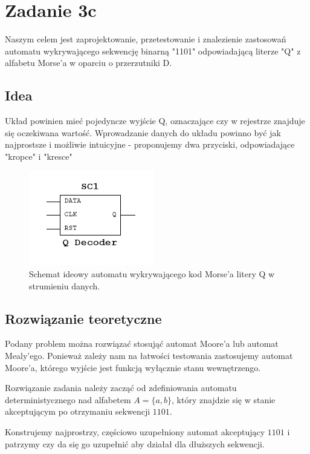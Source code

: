 \documentclass[12pt,a4paper,table]{article}
\begin{document}
    \pagebreak
    \section{Zadanie 3c}
    Naszym celem jest zaprojektowanie, przetestowanie i znalezienie zastosowań automatu wykrywającego sekwencję binarną "1101" odpowiadającą
    literze "Q" z alfabetu Morse'a w oparciu o przerzutniki D.

    \subsection{Idea}
    Układ powinien mieć pojedyncze wyjście Q, oznaczające czy w rejestrze znajduje się oczekiwana wartość.
    Wprowadzanie danych do układu powinno być jak najprostsze i możliwie intuicyjne - proponujemy dwa 
    przyciski, odpowiadające "kropce" i "kresce"


    \begin{figure}[h]
        \centering
        \includegraphics[width=0.3\linewidth]{images/q_idea.PNG}
        \caption{Schemat ideowy automatu wykrywającego kod Morse'a litery Q
        w strumieniu danych.}
        \label{fig:q_idea}
    \end{figure}

    \subsection{Rozwiązanie teoretyczne}
    Podany problem można rozwiązać stosująć automat Moore'a lub automat Mealy'ego.
    Ponieważ zależy nam na łatwości testowania zastosujemy automat Moore'a, którego wyjście jest funkcją wyłącznie stanu wewnętrzengo.

    Rozwiązanie zadania należy zacząć od zdefiniowania automatu deterministycznego nad alfabetem $ A =  \{a, b\} $, który znajdzie się w stanie akceptującym po otrzymaniu sekwencji $ 1101 $.
    
    Konstrujemy najprostrzy, częściowo uzupełniony automat akceptujący $1101$ i patrzymy czy da się go uzupełnić aby działał dla dłuższych sekwencji.
\end{document}
